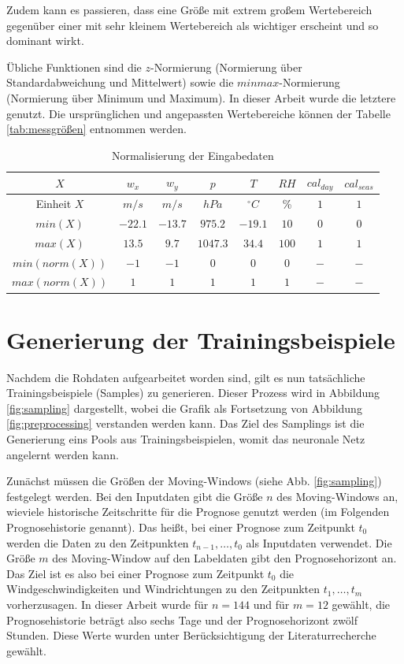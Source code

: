 \documentclass[
12pt, %
toc=listofnumbered, %
toc=chapterentrydotfill, %
numbers=noenddot, %
captions=tableheading, %
bibliography=numbered
]{scrreprt}
\let\Oldsection\section
\renewcommand{\section}{\FloatBarrier\Oldsection}
\begin{document}
Zudem kann es passieren, dass eine Größe mit extrem großem Wertebereich gegenüber einer mit sehr kleinem Wertebereich als wichtiger erscheint und so dominant wirkt.

Übliche Funktionen sind die $z$-Normierung (Normierung über Standardabweichung und Mittelwert) sowie die $minmax$-Normierung (Normierung über Minimum und Maximum). In dieser Arbeit wurde die letztere genutzt. Die ursprünglichen und angepassten Wertebereiche können der Tabelle \ref{tab:messgrößen} entnommen werden.

\begin{table}[ht]
	\centering
	\caption{Normalisierung der Eingabedaten}
	\begin{tabular}{|c|c|c|c|c|c|c|c|}
		\hline
		\rowcolor{color80}
		\textbf{$X$} & \textbf{$w_x$} & \textbf{$w_y$} & \textbf{$p$} & \textbf{$T$} & \textbf{$RH$} & \textbf{$cal_{day}$} & \textbf{$cal_{seas}$} \\ \hline
		Einheit $X$ & $m/s$ & $m/s$ & $hPa$ & $^\circ C$ & \% & $1$ & $1$ \\ \hline
		$min(X)$       & $-22.1$ & $-13.7$ & $975.2$ & $-19.1$ & $10$ & $0$ & $0$ \\ \hline
		$max(X)$       & $13.5$ & $9.7$ & $1047.3$ & $34.4$ & $100$ & $1$ & $1$ \\ \hline
		$min(norm(X))$ & $-1$ & $-1$ & $0$ & $0$ & $0$ & $-$ & $-$ \\ \hline
		$max(norm(X))$ & $1$ & $1$ & $1$ & $1$ & $1$ & $-$ & $-$ \\ \hline
	\end{tabular}
\label{tab:normalisierung}
\end{table}

\section{Generierung der Trainingsbeispiele}
Nachdem die Rohdaten aufgearbeitet worden sind, gilt es nun tatsächliche Trainingsbeispiele (Samples) zu generieren. Dieser Prozess wird in Abbildung \ref{fig:sampling} dargestellt, wobei die Grafik als Fortsetzung von Abbildung \ref{fig:preprocessing} verstanden werden kann. Das Ziel des Samplings ist die Generierung eins Pools aus Trainingsbeispielen, womit das neuronale Netz angelernt werden kann.

Zunächst müssen die Größen der Moving-Windows (siehe Abb. \ref{fig:sampling}) festgelegt werden. Bei den Inputdaten gibt die Größe $n$ des Moving-Windows an, wieviele historische Zeitschritte für die Prognose genutzt werden (im Folgenden Prognosehistorie genannt). Das heißt, bei einer Prognose zum Zeitpunkt $t_0$ werden die Daten zu den Zeitpunkten $t_{n-1}, \dots, t_0$ als Inputdaten verwendet. Die Größe $m$ des Moving-Window auf den Labeldaten gibt den Prognosehorizont an. Das Ziel ist es also bei einer Prognose zum Zeitpunkt $t_0$ die Windgeschwindigkeiten und Windrichtungen zu den Zeitpunkten $t_1, \dots, t_m$ vorherzusagen. In dieser Arbeit wurde für $n=144$ und für $m=12$ gewählt, die Prognosehistorie beträgt also sechs Tage und der Prognosehorizont zwölf Stunden. Diese Werte wurden unter Berücksichtigung der Literaturrecherche gewählt.
\end{document}
